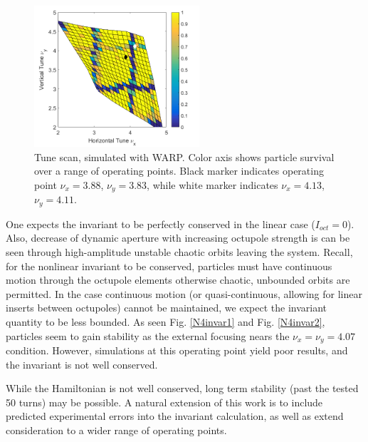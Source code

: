 \begin{figure}[!tb]
   \centering
    \includegraphics*[width=174pt]{6.figures/warp_tune_scan_plot}
 	\caption{Tune scan, simulated with WARP. Color axis shows particle survival over a range of operating points. Black marker indicates operating point $\nu_x=3.88$, $\nu_y=3.83$, while white marker indicates $\nu_x=4.13$, $\nu_y=4.11$.}
   \label{warpscan}
\end{figure}

One expects the invariant to be perfectly conserved in the linear case ($I_{oct}=0$). Also, decrease of dynamic aperture with increasing octupole strength is can be seen through high-amplitude unstable chaotic orbits leaving the system. Recall, for the nonlinear invariant to be conserved, particles must have continuous motion through the octupole elements otherwise chaotic, unbounded orbits are permitted.\cite{DN} In the case continuous motion (or quasi-continuous, allowing for linear inserts between octupoles) cannot be maintained, we expect the invariant quantity to be less bounded. As seen Fig. \ref{N4invar1} and Fig. \ref{N4invar2}, particles seem to gain stability as the external focusing nears the $\nu_x=\nu_y=4.07$ condition. However, simulations at this operating point yield poor results, and the invariant is not well conserved. 

While the Hamiltonian is not well conserved, long term stability (past the tested 50 turns) may be possible. A natural extension of this work is to include predicted experimental errors into the invariant calculation, as well as extend consideration to a wider range of operating points.


